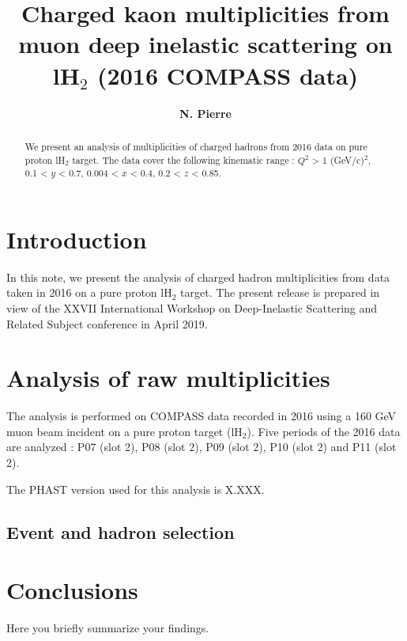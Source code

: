 \documentclass[letterpaper,12pt]{article}
\begin{document}
\title{\textbf{Charged kaon multiplicities from muon deep inelastic scattering on lH$_2$ (2016 COMPASS data)}}
\author[1,2]{\textbf{N. Pierre}}
\maketitle

\begin{abstract}
  We present an analysis of multiplicities of charged hadrons from 2016 data on pure proton lH$_2$ target.
  The data cover the following kinematic range : $Q^2$ > 1 (GeV/c)$^2$, 0.1 < $y$ < 0.7, 0.004 < $x$ < 0.4,
  0.2 < $z$ < 0.85.
\end{abstract}

\newpage

\section{Introduction}

In this note, we present the analysis of charged hadron multiplicities from data taken in 2016 on a pure proton lH$_2$ target.
The present release is prepared in view of the XXVII International Workshop on Deep-Inelastic Scattering and Related Subject
conference in April 2019.

\section{Analysis of raw multiplicities}

The analysis is performed on COMPASS data recorded in 2016 using a 160 GeV muon beam incident on a pure proton target (lH$_2$).
Five periods of the 2016 data are analyzed : P07 (slot 2), P08 (slot 2), P09 (slot 2), P10 (slot 2) and P11 (slot 2).

The PHAST version used for this analysis is X.XXX.

\subsection{Event and hadron selection}


\section{Conclusions}
Here you briefly summarize your findings.


\begin{thebibliography}{99}


\end{thebibliography}
\end{document}
